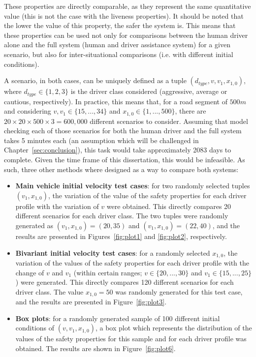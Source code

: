 These properties are directly comparable, as they represent the same quantitative value (this is not the case with the liveness properties). It should be noted that the lower the value of this property, the safer the system is. This means that these properties can be used not only for comparisons between the human driver alone and the full system (human and driver assistance system) for a given scenario, but also for inter-situational comparisons (i.e. with different initial conditions).

A scenario, in both cases, can be uniquely defined as a tuple $(d_{type}, v, v_1, x_{1,0})$, where $d_{type} \in \{1,2,3\}$ is the driver class considered (aggressive, average or cautious, respectively). In practice, this means that, for a road segment of $500m$ and considering $v, v_1 \in \{15,...,34\}$ and $x_{1,0} \in \{1,...,500\}$, there are $20 \times 20 \times 500 \times 3 = 600,000$ different scenarios to consider. Assuming that model checking each of those scenarios for both the human driver and the full system takes 5 minutes each (an assumption which will be challenged in Chapter~\ref{sec:conclusion}), this task would take approximately 2083 days to complete. Given the time frame of this dissertation, this would be infeasible. As such, three other methods where designed as a way to compare both systems: 

\begin{itemize}
	\item \textbf{Main vehicle initial velocity test cases}: for two randomly selected tuples $(v_1, x_{1,0})$, the variation of the value of the safety properties for each driver profile with the variation of $v$ were obtained. This directly compares 20 different scenarios for each driver class. The two tuples were randomly generated as $(v_1, x_{1,0}) = (20, 35)$ and $(v_1, x_{1,0}) = (22, 40)$, and the results are presented in Figures~\ref{fig:plot1} and \ref{fig:plot2}, respectively.
	\item \textbf{Bivariant initial velocity test cases}: for a randomly selected $x_{1,0}$, the variation of the values of the safety properties for each driver profile with the change of $v$ and $v_1$ (within certain ranges; $v \in \{20,...,30\}$ and $v_1\in \{15,...,25\}$) were generated. This directly compares 120 different scenarios for each driver class. The value $x_{1,0} = 50$ was randomly generated for this test case, and the results are presented in Figure~\ref{fig:plot3}.
	\item \textbf{Box plots}: for a randomly generated sample of 100 different initial conditions of $(v, v_1, x_{1,0})$, a box plot which represents the distribution of the values of the safety properties for this sample and for each driver profile was obtained. The results are shown in Figure~\ref{fig:plot6}.
\end{itemize}

